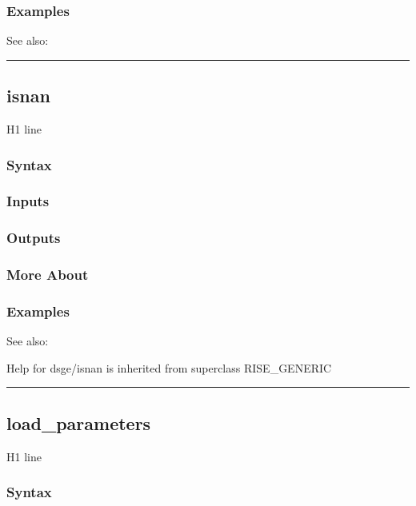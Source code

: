 \documentclass[letterpaper,10pt,english]{sphinxmanual}
\begin{document}
\subsubsection{Examples}
\label{classes/models/@dsge/dsge:id73}
See also:


\bigskip\hrule{}\bigskip



\subsection{isnan}
\label{classes/models/@dsge/dsge:isnan}\label{classes/models/@dsge/dsge:id74}
H1 line


\subsubsection{Syntax}
\label{classes/models/@dsge/dsge:id75}

\subsubsection{Inputs}
\label{classes/models/@dsge/dsge:id76}

\subsubsection{Outputs}
\label{classes/models/@dsge/dsge:id77}

\subsubsection{More About}
\label{classes/models/@dsge/dsge:id78}

\subsubsection{Examples}
\label{classes/models/@dsge/dsge:id79}
See also:

Help for dsge/isnan is inherited from superclass RISE\_GENERIC


\bigskip\hrule{}\bigskip



\subsection{load\_parameters}
\label{classes/models/@dsge/dsge:id80}\label{classes/models/@dsge/dsge:load-parameters}
H1 line


\subsubsection{Syntax}
\label{classes/models/@dsge/dsge:id81}
\end{document}
